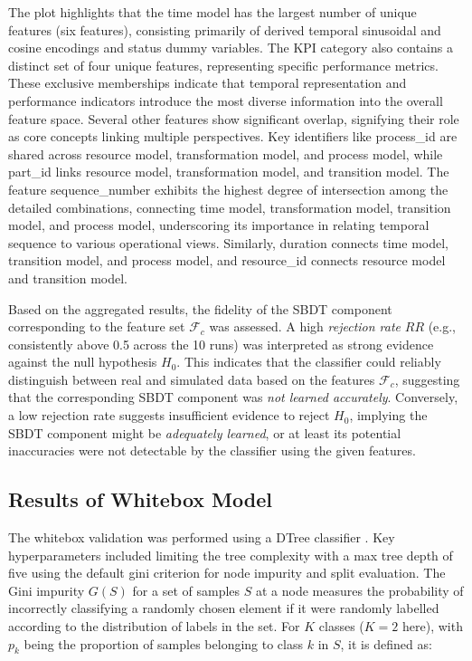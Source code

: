 The plot highlights that the time model has the largest number of unique features (six features), consisting primarily of derived temporal sinusoidal and cosine encodings and status dummy variables. The KPI category also contains a distinct set of four unique features, representing specific performance metrics. These exclusive memberships indicate that temporal representation and performance indicators introduce the most diverse information into the overall feature space.
Several other features show significant overlap, signifying their role as core concepts linking multiple perspectives. Key identifiers like process\_id are shared across resource model, transformation model, and process model, while part\_id links resource model, transformation model, and transition model. The feature sequence\_number exhibits the highest degree of intersection among the detailed combinations, connecting time model, transformation model, transition model, and process model, underscoring its importance in relating temporal sequence to various operational views. Similarly, duration connects time model, transition model, and process model, and resource\_id connects resource model and transition model.

Based on the aggregated results, the fidelity of the SBDT component corresponding to the feature set $\mathcal{F}_c$ was assessed. A high \textit{rejection rate} $RR$ (e.g., consistently above 0.5 across the 10 runs) was interpreted as strong evidence against the null hypothesis $H_0$. This indicates that the classifier could reliably distinguish between real and simulated data based on the features $\mathcal{F}_c$, suggesting that the corresponding SBDT component was \textit{not learned accurately}. Conversely, a low rejection rate suggests insufficient evidence to reject $H_0$, implying the SBDT component might be \textit{adequately learned}, or at least its potential inaccuracies were not detectable by the classifier using the given features.

\subsection*{Results of Whitebox Model}
\label{sec:results-whitebox}
The whitebox validation was performed using a DTree classifier \autocite{Scikit-Learn}. Key hyperparameters included limiting the tree complexity with a max tree depth of five using the default gini criterion for node impurity and split evaluation. The Gini impurity $G(S)$ for a set of samples $S$ at a node measures the probability of incorrectly classifying a randomly chosen element if it were randomly labelled according to the distribution of labels in the set. For $K$ classes ($K = 2$ here), with $p_k$ being the proportion of samples belonging to class $k$ in $S$, it is defined as:

